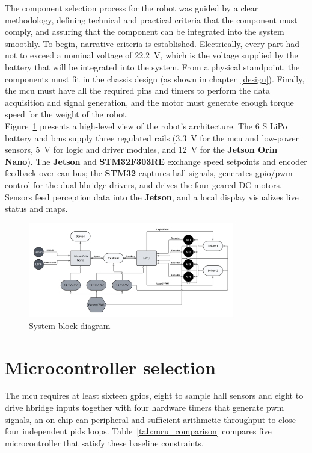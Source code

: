 The component selection process for the robot was guided by a clear methodology, defining technical and practical criteria that the component must comply, and assuring that the component can be integrated into the system smoothly.
To begin, narrative criteria is established. Electrically, every part had not to exceed a nominal voltage of \SI{22.2}{\volt}, which is the voltage supplied by the battery that will be integrated into the system. From a physical standpoint, the components must fit in the chassis design (as shown in chapter~\ref{design}). Finally, the \gls{mcu} must have all the required pins and timers to perform the data acquisition and signal generation, and the motor must generate enough torque speed for the weight of the robot.\\
Figure~\ref{fig:block-diagram} presents a high-level view of the robot's architecture. The 6 S LiPo battery and \gls{bms} supply three regulated rails (\SI{3.3}{\volt} for the \gls{mcu} and low-power sensors, \SI{5}{\volt} for logic and driver modules, and \SI{12}{\volt} for the \textbf{Jetson Orin Nano}). The \textbf{Jetson} and \textbf{STM32F303RE} exchange speed setpoints and encoder feedback over \gls{can} bus; the \textbf{STM32} captures \gls{hall} signals, generates \gls{gpio}/\gls{pwm} control for the dual \gls{hbridge} drivers, and drives the four geared DC motors. Sensors feed perception data into the \textbf{Jetson}, and a local display visualizes live status and maps.

\begin{figure}[H]
  \centering
  \includegraphics[width=0.8\textwidth]{imgs/blockdiagram.png}
  \caption{System block diagram}
  \label{fig:block-diagram}
\end{figure}

\section{Microcontroller selection}

The \gls{mcu} requires at least sixteen \glspl{gpio}, eight to sample \gls{hall} sensors and eight to drive \gls{hbridge} inputs together with four hardware timers that generate \gls{pwm} signals, an on-chip \gls{can} peripheral and sufficient arithmetic throughput to close four independent \glspl{pid} loops. 
Table~\ref{tab:mcu_comparison} compares five microcontroller that satisfy these baseline constraints.

